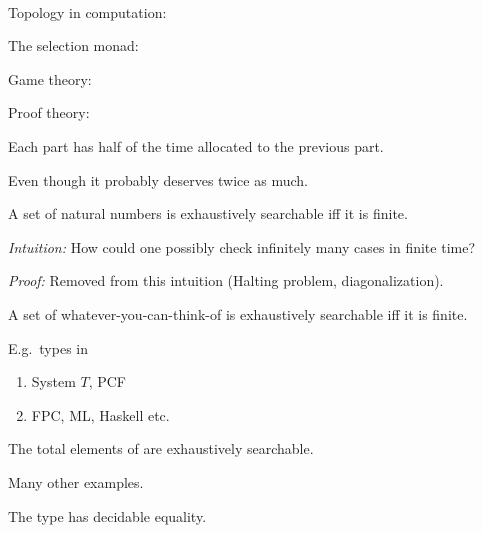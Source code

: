 \documentclass%
[%
Screen4to3,
]{foils}
\begin{document}
~

 Topology in computation: 

\vfill

 The selection monad: 

\vfill

 Game theory: 

\vfill

 Proof theory: 


Each part has half of the time allocated to the previous part.

Even though it probably deserves twice as much.



A set of natural numbers is exhaustively searchable iff it is finite.

\vfill

\emph{Intuition:}
How could one possibly check infinitely many cases in finite time?

\emph{Proof:} Removed from this intuition (Halting problem, diagonalization).



A set of whatever-you-can-think-of is exhaustively searchable iff it is finite.




\vfill

E.g.\ types in 
\begin{enumerate}
\item[\grey{1.}] System $T$, PCF
\item[\grey{2.}] FPC, ML, Haskell etc.
\end{enumerate}



\vfill

 The total elements of \darkblue{$\Nat \to \Bool$} are
exhaustively searchable.

\vfill

Many other examples.


The type \darkblue{$(\Nat \to \Bool) \to \Nat$} has decidable equality.

\vfill
\end{document}
